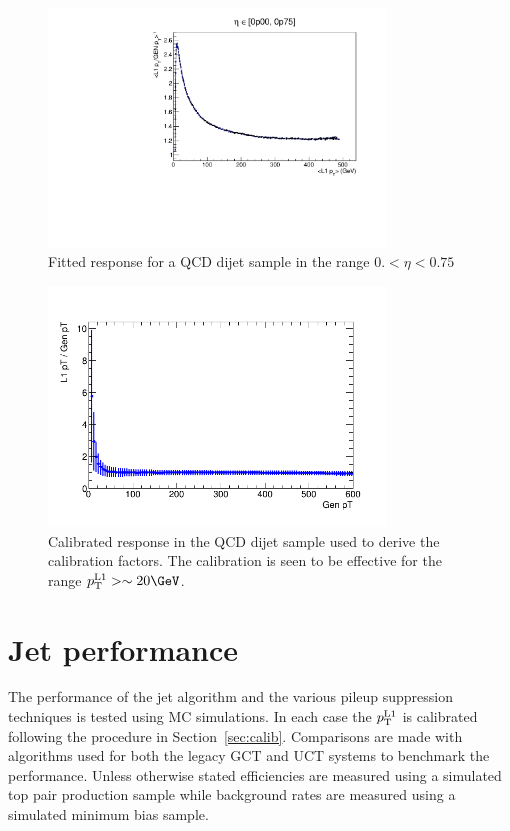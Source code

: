 \begin{figure}
\centering
    \includegraphics[width=0.8\textwidth]{./Figures/triggerUpgrade/calibrationSeed5Chunky}
  \caption{
  Fitted response for a QCD dijet sample in the range $0. < \eta < 0.75$ }
  \label{fig:response}
\end{figure}

\begin{figure}
\centering
    \includegraphics[width=0.8\textwidth]{./Figures/triggerUpgrade/calib_s5_chunky}
  \caption{Calibrated response in the QCD dijet sample used to derive the calibration factors. The calibration is seen to be 
  effective for the range $\Lonept > \sim 20\GeV$.}
  \label{fig:closure_response}
\end{figure}

\section{Jet performance}
\label{sec:trig_perf}
The performance of the jet algorithm and the various pileup suppression techniques is tested using
MC simulations. In each case the ${p_{\text T}^{\text{L1}}}$ is calibrated following the procedure in Section~\ref{sec:calib}.
Comparisons are made with algorithms used for both the legacy GCT and UCT systems to benchmark the performance.
Unless otherwise stated efficiencies are measured using a simulated top pair production sample while 
background rates are measured using a simulated minimum bias sample.

